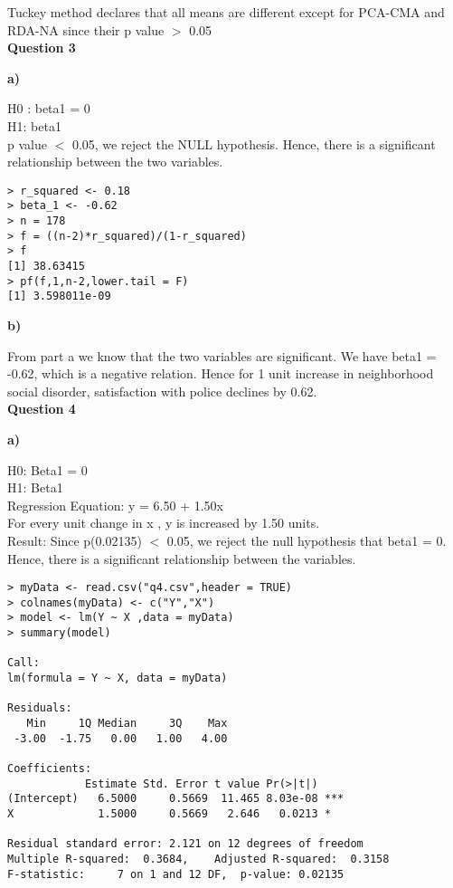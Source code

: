 \documentclass[12pt,letterpaper]{article}
\begin{document}
Tuckey method declares that all means are different except for PCA-CMA and RDA-NA since their p value $>$ 0.05 \\

{\Large \textbf{Question 3}}

\textbf{{a)}}

H0 : beta1 = 0\\
H1: beta1 \\

p value $<$ 0.05, we reject the NULL hypothesis. Hence, there is a significant relationship between the two variables. 

\begin{lstlisting}[label=R Code,caption=Q3(a) R Code Output]
> r_squared <- 0.18
> beta_1 <- -0.62
> n = 178
> f = ((n-2)*r_squared)/(1-r_squared)
> f
[1] 38.63415
> pf(f,1,n-2,lower.tail = F)
[1] 3.598011e-09

\end{lstlisting}
\textbf{{b)}}

From part a we know that the two variables are significant. We have beta1 = -0.62, which is a negative relation. Hence for 1 unit increase in neighborhood social disorder, satisfaction with police declines by 0.62. \\

{\Large \textbf{Question 4}}

\textbf{{a)}}

H0: Beta1 = 0\\
H1: Beta1  \\

Regression Equation: y = 6.50 + 1.50x\\
For every unit change in x , y is increased by 1.50 units. \\

Result: Since p(0.02135)  $<$  0.05, we reject the null hypothesis that beta1 = 0. 
Hence, there is a significant relationship between the variables.

\begin{lstlisting}[label=R Code,caption=Q4 (a) R Code Output]
> myData <- read.csv("q4.csv",header = TRUE)
> colnames(myData) <- c("Y","X")
> model <- lm(Y ~ X ,data = myData)
> summary(model)

Call:
lm(formula = Y ~ X, data = myData)

Residuals:
   Min     1Q Median     3Q    Max 
 -3.00  -1.75   0.00   1.00   4.00 

Coefficients:
            Estimate Std. Error t value Pr(>|t|)    
(Intercept)   6.5000     0.5669  11.465 8.03e-08 ***
X             1.5000     0.5669   2.646   0.0213 *  

Residual standard error: 2.121 on 12 degrees of freedom
Multiple R-squared:  0.3684,	Adjusted R-squared:  0.3158 
F-statistic:     7 on 1 and 12 DF,  p-value: 0.02135


\end{lstlisting}
\end{document}
